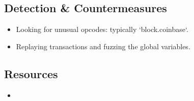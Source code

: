 \subsection{Detection \& Countermeasures}

\begin{itemize}
\item{Looking for unusual opcodes: typically `block.coinbase`.}
\item{Replaying transactions and fuzzing the global variables.}
\end{itemize}

\subsection{Resources}

\begin{itemize}
\item{\cite{article-red-pill}}
\end{itemize}
